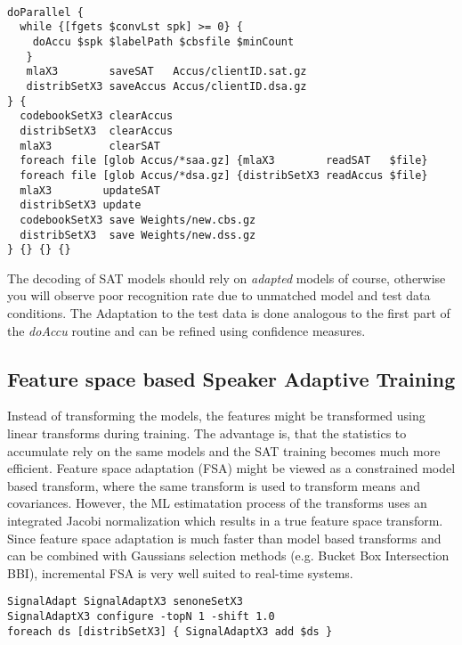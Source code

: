 \begin{verbatim}

doParallel {
  while {[fgets $convLst spk] >= 0} { 
    doAccu $spk $labelPath $cbsfile $minCount 
   }
   mlaX3        saveSAT   Accus/clientID.sat.gz
   distribSetX3 saveAccus Accus/clientID.dsa.gz
} {
  codebookSetX3 clearAccus
  distribSetX3  clearAccus
  mlaX3         clearSAT 
  foreach file [glob Accus/*saa.gz] {mlaX3        readSAT   $file}
  foreach file [glob Accus/*dsa.gz] {distribSetX3 readAccus $file}
  mlaX3        updateSAT 
  distribSetX3 update
  codebookSetX3 save Weights/new.cbs.gz
  distribSetX3  save Weights/new.dss.gz 
} {} {} {}

\end{verbatim}

The decoding  of  SAT models should rely   on {\em adapted}  models of
course, otherwise  you  will observe   poor recognition  rate due   to
unmatched model and test data  conditions.  The Adaptation to the test
data is done analogous to  the first part  of the {\em doAccu} routine
and can be refined using confidence measures.

\subsection{Feature space based Speaker Adaptive Training} \label{sec:fsat}

Instead of transforming the  models, the features might be transformed
using  linear transforms during training.  The  advantage is, that the
statistics to accumulate rely on the  same models and the SAT training
becomes much more efficient.  Feature space adaptation (FSA)  might be
viewed   as  a  constrained model   based   transform, where the  same
transform is used to transform  means and covariances. However, the ML
estimatation  process of  the  transforms  uses  an integrated  Jacobi
normalization  which results in a true  feature space transform. Since
feature  space adaptation is much  faster  than model based transforms
and can be combined with  Gaussians selection methods (e.g. Bucket Box
Intersection  BBI), incremental FSA is  very well suited to real-time
systems.

\begin{verbatim}
SignalAdapt SignalAdaptX3 senoneSetX3
SignalAdaptX3 configure -topN 1 -shift 1.0
foreach ds [distribSetX3] { SignalAdaptX3 add $ds }
\end{verbatim}


